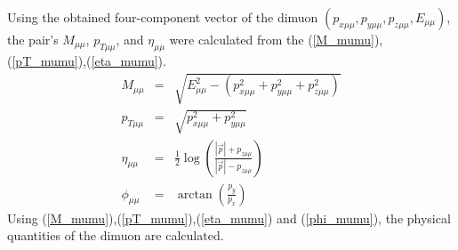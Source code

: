                 Using the obtained four-component vector of the dimuon $(p_{x\mu\mu}, p_{y\mu\mu}, p_{z\mu\mu}, E_{\mu\mu})$, the pair's $M_{\mu\mu}$, $p_{T\mu\mu}$, and $\eta_{\mu\mu}$ were calculated from the (\ref{M_mumu}),(\ref{pT_mumu}),(\ref{eta_mumu}).
                \begin{eqnarray}
                    \label{M_mumu}
                    M_{\mu\mu} &=& \sqrt{E^2_{\mu\mu} - (p_{x\mu\mu}^2 + p_{y\mu\mu}^2 + p_{z\mu\mu}^2)}\\ 
                    \label{pT_mumu}
                    p_{T\mu\mu} &=& \sqrt{p_{x\mu\mu}^2 + p_{y\mu\mu}^2}\\ 
                    \label{eta_mumu}
                    \eta_{\mu\mu} &=& \frac{1}{2}\log(\frac{|\vec{p}|+p_{z\mu\mu}}{|\vec{p}|-p_{z\mu\mu}})\\
                    \label{phi_mumu}
                    \phi_{\mu\mu} &=& \arctan(\frac{p_y}{p_x})
                \end{eqnarray}
                Using (\ref{M_mumu}),(\ref{pT_mumu}),(\ref{eta_mumu}) and (\ref{phi_mumu}), the physical quantities of the dimuon are calculated.
                

